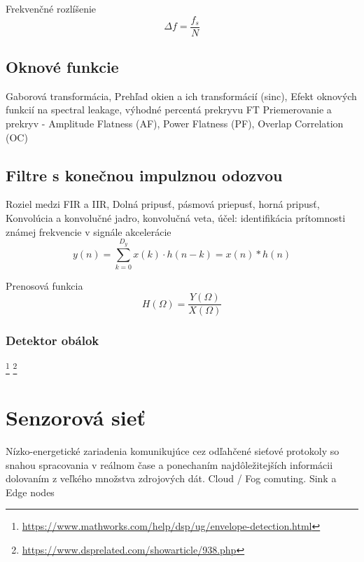 Frekvenčné rozlíšenie
\begin{equation}
\Delta f = \frac{f_s}{N}
\end{equation}

\subsection{Oknové funkcie}
Gaborová transformácia, Prehľad okien a ich transformácií (sinc), Efekt oknových funkcií na spectral leakage, výhodné percentá prekryvu FT 	\cite{understanding-dsp} \cite{spectral-density-estimation}
Priemerovanie a prekryv - Amplitude Flatness (AF), Power Flatness (PF), Overlap Correlation (OC)

\subsection{Filtre s konečnou impulznou odozvou}
\label{fir-filter}
Roziel medzi FIR a IIR, Dolná pripusť, pásmová priepusť, horná pripusť,
 Konvolúcia a konvolučné jadro, konvolučná veta, účel: identifikácia prítomnosti známej frekvencie v signále akcelerácie
\begin{equation}
y(n) = \sum_{k=0}^{D_y}{x(k) \cdot h(n-k)} = x(n) * h(n)
\end{equation}

Prenosová funkcia
\begin{equation}
H(\Omega) = \frac{Y(\Omega)}{X(\Omega)}
\end{equation}

\subsubsection{Detektor obálok}
\footnote{\url{https://www.mathworks.com/help/dsp/ug/envelope-detection.html}}
\footnote{\url{https://www.dsprelated.com/showarticle/938.php}}

\section{Senzorová sieť}
Nízko-energetické zariadenia komunikujúce cez odľahčené sieťové protokoly so snahou spracovania v reálnom čase a ponechaním najdôležitejších informácii dolovaním z veľkého množstva zdrojových dát. Cloud / Fog comuting. Sink a Edge nodes

